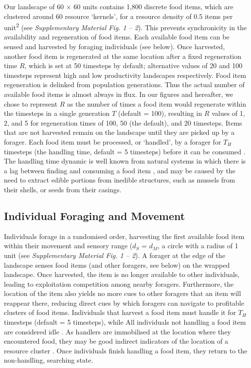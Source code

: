 Our landscape of 60 $\times$ 60 units contains 1,800 discrete food items, which are clustered around 60 resource `kernels', for a resource density of 0.5 items per unit\textsuperscript{2} (see \textit{Supplementary Material Fig. 1 -- 2}).
This prevents synchronicity in the availability and regeneration of food items.
Each available food item can be sensed and harvested by foraging individuals (see below).
Once harvested, another food item is regenerated at the same location after a fixed regeneration time $R$, which is set at 50 timesteps by default; alternative values of 20 and 100 timesteps represent high and low productivity landscapes respectively.
Food item regeneration is delinked from population generations.
Thus the actual number of available food items is almost always in flux.
In our figures and hereafter, we chose to represent $R$ as the number of times a food item would regenerate within the timesteps in a single generation $T$ (default = 100), resulting in $R$ values of 1, 2, and 5 for regeneration times of 100, 50 (the default), and 20 timesteps.
Items that are not harvested remain on the landscape until they are picked up by a forager.
Each food item must be processed, or `handled', by a forager for $T_H$ timesteps (the handling time, default = 5 timesteps) before it can be consumed \citep{ruxton1992,gupte2021a}.
The handling time dynamic is well known from natural systems in which there is a lag between finding and consuming a food item \citep{ruxton1992}, and may be caused by the need to extract edible portions from inedible structures, such as mussels from their shells, or seeds from their casings.

\subsection*{Individual Foraging and Movement}

Individuals forage in a randomised order, harvesting the first available food item within their movement and sensory range ($d_S$ = $d_M$, a circle with a radius of 1 unit (see \textit{Supplementary Material Fig. 1 -- 2}).
A forager at the edge of the landscape senses food items (and other foragers, see below) on the wrapped landscape.
Once harvested, the item is no longer available to other individuals, leading to exploitation competition among nearby foragers.
Furthermore, the location of the item also yields no more cues to other foragers that an item will reappear there, reducing direct cues by which foragers can navigate to profitable clusters of food items.
Individuals that harvest a food item must handle it for $T_H$ timesteps (default = 5 timesteps), while 
All individuals not handling a food item are considered idle \citep{ruxton1992,gupte2021a}.
As handlers are immobilised at the location where they encountered food, they may be good indirect indicators of the location of a resource cluster \cite[`social information'][]{danchin2004,romano2020,gupte2021a}.
Once individuals finish handling a food item, they return to the non-handling, searching state.

